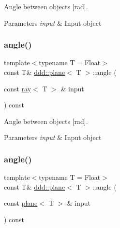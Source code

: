 Angle between objects \mbox{[}rad\mbox{]}. 


\begin{DoxyParams}{Parameters}
{\em input} & Input object \\
\hline
\end{DoxyParams}
\mbox{\label{classddd_1_1plane_a4e472e461308a96438c26b73b9338593}} 
\subsubsection{\texorpdfstring{angle()}{angle()}\hspace{0.1cm}{\footnotesize\ttfamily [3/5]}}
{\footnotesize\ttfamily template$<$typename T = Float$>$ \\
const T\& \hyperlink{classddd_1_1plane}{ddd\+::plane}$<$ T $>$\+::angle (\begin{DoxyParamCaption}\item[{const \hyperlink{classddd_1_1ray}{ray}$<$ T $>$ \&}]{input }\end{DoxyParamCaption}) const\hspace{0.3cm}{\ttfamily [inline]}}



Angle between objects \mbox{[}rad\mbox{]}. 


\begin{DoxyParams}{Parameters}
{\em input} & Input object \\
\hline
\end{DoxyParams}
\mbox{\label{classddd_1_1plane_ae6f58f5c23ff49aa351f22ccccee46b6}} 
\subsubsection{\texorpdfstring{angle()}{angle()}\hspace{0.1cm}{\footnotesize\ttfamily [4/5]}}
{\footnotesize\ttfamily template$<$typename T = Float$>$ \\
const T\& \hyperlink{classddd_1_1plane}{ddd\+::plane}$<$ T $>$\+::angle (\begin{DoxyParamCaption}\item[{const \hyperlink{classddd_1_1plane}{plane}$<$ T $>$ \&}]{input }\end{DoxyParamCaption}) const\hspace{0.3cm}{\ttfamily [inline]}}



